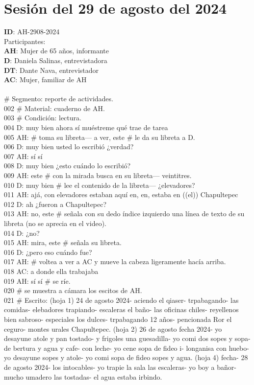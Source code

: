 \section{Sesión del 29 de agosto del 2024}
\noindent
\textbf{ID}: AH-2908-2024\\
Participantes:\\
\textbf{AH}: Mujer de 65 años, informante\\
\textbf{D}: Daniela Salinas, entrevistadora\\
\textbf{DT}: Dante Nava, entrevistador\\
\textbf{AC}: Mujer, familiar de AH\\
\\
 \# Segmento: reporte de actividades.\\
002 \# Material: cuaderno de AH.\\
003 \# Condición: lectura.\\
004 D: muy bien ahora sí muéstreme qué trae de tarea\\
005 AH: \# toma su libreta--- a ver, este \# le da su libreta a D.\\
006 D: muy bien usted lo escribió ¿verdad?\\
007 AH: sí sí\\
008 D: muy bien ¿esto cuándo lo escribió?\\
009 AH: este \# con la mirada busca en su libreta--- veintitres.\\
010 D: muy bien \# lee el contenido de la libreta--- ¿elevadores?\\
011 AH: ajá, con elevadores estaban aquí en, en, estaba en ((el)) Chapultepec\\
012 D: ah ¿fueron a Chapultepec?\\
013 AH: no, este \# señala con su dedo índice izquierdo una línea de texto de su libreta (no se aprecia en el video).\\
014 D: ¿no?\\
015 AH: mira, este \# señala su libreta.\\
016 D: ¿pero eso cuándo fue?\\
017 AH: \# voltea a ver a AC y mueve la cabeza ligeramente hacía arriba.\\
018 AC: a donde ella trabajaba\\
019 AH: sí sí \# se ríe.\\
020 \# se muestra a cámara los escitos de AH.\\
021 \# Escrito: (hoja 1) 24 de agosto 2024- aciendo el qiaser- trpabagando- las comidas- elebadores trapiando- escaleras el baño- las oficinas chiles- reyellenos bien sabroso- especiales los dulces- trpabagando 12 años- pencionada Ror el ceguro- montes urales Chapultepec. (hoja 2) 26 de agosto fecha 2024- yo desayune atole y pan tostado- y frigoles una guesadilla- yo comi dos sopes y sopa- de bertura y agua y cafe- con leche- yo cene sopa de fideo i- longanisa con huebo- yo desayune sopes y atole- yo comi sopa de fideo sopes y agua. (hoja 4) fecha- 28 de agosto 2024- los intocables- yo trapie la sala las escaleras- yo boy a bañor- mucho umadero las tostadas- el agua estaba irbindo.\\
